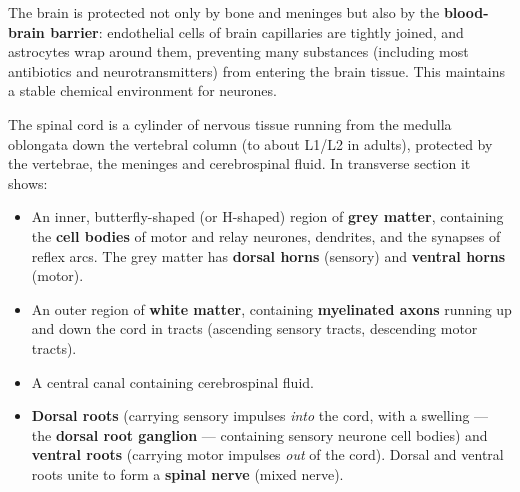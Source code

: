 \documentclass[11pt]{article}
\newcounter{popsec}
\newcounter{popsub}
\newcommand{\courssub}[1]{%
  \stepcounter{popsub}%
  \par\vspace{9pt}\noindent{\popxbold\fontsize{11.5}{13}\selectfont\color{popink}{\color{poporange}\thepopsec.\thepopsub}\hspace{6pt}#1}\par\nopagebreak\vspace{4pt}
}
\begin{document}
\begin{savaistu}
The brain is protected not only by bone and meninges but also by the \textbf{blood-brain barrier}: endothelial cells of brain capillaries are tightly joined, and astrocytes wrap around them, preventing many substances (including most antibiotics and neurotransmitters) from entering the brain tissue. This maintains a stable chemical environment for neurones.
\end{savaistu}

\courssub{The Spinal Cord}

The spinal cord is a cylinder of nervous tissue running from the medulla oblongata down the vertebral column (to about L1/L2 in adults), protected by the vertebrae, the meninges and cerebrospinal fluid. In transverse section it shows:

\begin{itemize}
\item An inner, butterfly-shaped (or H-shaped) region of \textbf{grey matter}, containing the \textbf{cell bodies} of motor and relay neurones, dendrites, and the synapses of reflex arcs. The grey matter has \textbf{dorsal horns} (sensory) and \textbf{ventral horns} (motor).
\item An outer region of \textbf{white matter}, containing \textbf{myelinated axons} running up and down the cord in tracts (ascending sensory tracts, descending motor tracts).
\item A central canal containing cerebrospinal fluid.
\item \textbf{Dorsal roots} (carrying sensory impulses \emph{into} the cord, with a swelling — the \textbf{dorsal root ganglion} — containing sensory neurone cell bodies) and \textbf{ventral roots} (carrying motor impulses \emph{out} of the cord). Dorsal and ventral roots unite to form a \textbf{spinal nerve} (mixed nerve).
\end{itemize}
\end{document}
